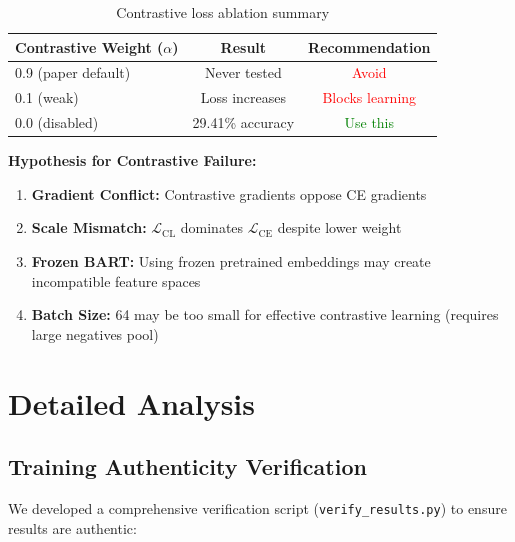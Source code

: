 \documentclass[12pt,a4paper]{article}
\begin{document}
\begin{table}[H]
\centering
\begin{tabular}{lcc}
\toprule
\textbf{Contrastive Weight ($\alpha$)} & \textbf{Result} & \textbf{Recommendation} \\
\midrule
0.9 (paper default) & Never tested & \textcolor{red}{Avoid} \\
0.1 (weak) & Loss increases & \textcolor{red}{Blocks learning} \\
0.0 (disabled) & 29.41\% accuracy & \textcolor{green}{Use this} \\
\bottomrule
\end{tabular}
\caption{Contrastive loss ablation summary}
\end{table}

\textbf{Hypothesis for Contrastive Failure:}
\begin{enumerate}
    \item \textbf{Gradient Conflict:} Contrastive gradients oppose CE gradients
    \item \textbf{Scale Mismatch:} $\mathcal{L}_{\text{CL}}$ dominates $\mathcal{L}_{\text{CE}}$ despite lower weight
    \item \textbf{Frozen BART:} Using frozen pretrained embeddings may create incompatible feature spaces
    \item \textbf{Batch Size:} 64 may be too small for effective contrastive learning (requires large negatives pool)
\end{enumerate}

\section{Detailed Analysis}

\subsection{Training Authenticity Verification}

We developed a comprehensive verification script (\texttt{verify\_results.py}) to ensure results are authentic:
\end{document}
